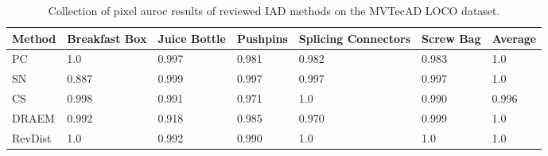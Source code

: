 \begin{table}[htbp]
    \tiny
    \centering
    \begin{tabularx}{\textwidth}{|X|X|X|X|X|X|X|}%
        \hline
        \textbf{Method} & \textbf{Breakfast Box} & \textbf{Juice Bottle} & \textbf{Pushpins} & \textbf{Splicing Connectors} & \textbf{Screw Bag} & \textbf{Average} \\
        \hline
        PC \cite{patchCore2022} & 1.0 & 0.997 & 0.981 & 0.982 & 0.983 & 1.0 \\
        \hline
        SN \cite{liu2023simplenet} & 0.887 & 0.999 & 0.997 & 0.997 & 0.997 & 1.0 \\
        \hline
        CS \cite{csflow2022} & 0.998 & 0.991 & 0.971 & 1.0 & 0.990 & 0.996 \\
        \hline
        DRAEM \cite{Zavrtanik_2021DRAEM} & 0.992 & 0.918 & 0.985 & 0.970 & 0.999 & 1.0 \\
        \hline
        RevDist \cite{revdist2023} & 1.0 & 0.992 & 0.990 & 1.0 & 1.0 & 1.0 \\
        \hline
    \end{tabularx}
    \caption{Collection of pixel auroc results of reviewed IAD methods on the MVTecAD LOCO \cite{LOCODentsAndScratchesBergmann2022} dataset.}
    \label{tab:pixelaurocloco}
\end{table}